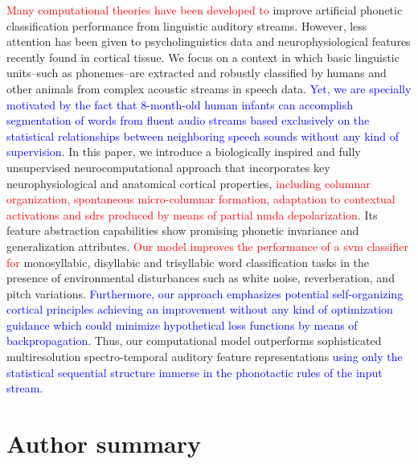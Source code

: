 \documentclass[10pt,letterpaper]{article}
\begin{document}
\textcolor{red}{Many computational theories have been developed to} improve artificial phonetic classification performance from linguistic auditory streams. However, less attention has been given to psycholinguistics data and neurophysiological features recently found in cortical tissue. We focus on a context in which basic linguistic units–such as phonemes–are extracted and robustly classified by humans and other animals from complex acoustic streams in speech data. \textcolor{blue}{Yet, we are specially motivated by the fact that 8-month-old human infants can accomplish segmentation of words from fluent audio streams based exclusively on the statistical relationships between neighboring speech sounds without any kind of supervision}. In this paper, we introduce a biologically inspired and fully unsupervised neurocomputational approach that incorporates key neurophysiological and anatomical cortical properties, \textcolor{red}{including columnar organization, spontaneous micro-columnar formation, adaptation to contextual activations and \glspl{sdr} produced by means of partial \gls{nmda} depolarization}. Its feature abstraction capabilities show promising phonetic invariance and generalization attributes. \textcolor{red}{Our model improves the performance of a \gls{svm} classifier for} monosyllabic, disyllabic and trisyllabic word classification tasks in the presence of environmental disturbances such as white noise, reverberation, and pitch variations. \textcolor{blue}{Furthermore, our approach emphasizes potential self-organizing cortical principles achieving an improvement without any kind of optimization guidance which could minimize hypothetical loss functions by means of backpropagation}. Thus, our computational model outperforms sophisticated multiresolution spectro-temporal auditory feature representations \textcolor{blue}{using only the statistical sequential structure immerse in the phonotactic rules of the input stream}.

%



\section*{Author summary}
\end{document}

